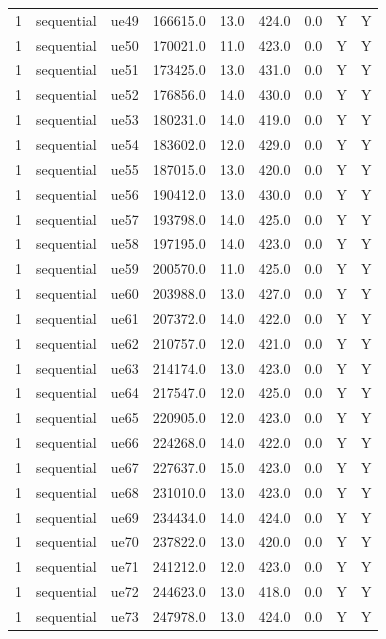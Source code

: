 \begin{table}[ht]
\begin{tabular}{|c|c|c|c|c|c|c|c|c|}
1 & sequential & ue49 & 166615.0 & 13.0 & 424.0 & 0.0 & Y & Y \\
1 & sequential & ue50 & 170021.0 & 11.0 & 423.0 & 0.0 & Y & Y \\
1 & sequential & ue51 & 173425.0 & 13.0 & 431.0 & 0.0 & Y & Y \\
1 & sequential & ue52 & 176856.0 & 14.0 & 430.0 & 0.0 & Y & Y \\
1 & sequential & ue53 & 180231.0 & 14.0 & 419.0 & 0.0 & Y & Y \\
1 & sequential & ue54 & 183602.0 & 12.0 & 429.0 & 0.0 & Y & Y \\
1 & sequential & ue55 & 187015.0 & 13.0 & 420.0 & 0.0 & Y & Y \\
1 & sequential & ue56 & 190412.0 & 13.0 & 430.0 & 0.0 & Y & Y \\
1 & sequential & ue57 & 193798.0 & 14.0 & 425.0 & 0.0 & Y & Y \\
1 & sequential & ue58 & 197195.0 & 14.0 & 423.0 & 0.0 & Y & Y \\
1 & sequential & ue59 & 200570.0 & 11.0 & 425.0 & 0.0 & Y & Y \\
1 & sequential & ue60 & 203988.0 & 13.0 & 427.0 & 0.0 & Y & Y \\
1 & sequential & ue61 & 207372.0 & 14.0 & 422.0 & 0.0 & Y & Y \\
1 & sequential & ue62 & 210757.0 & 12.0 & 421.0 & 0.0 & Y & Y \\
1 & sequential & ue63 & 214174.0 & 13.0 & 423.0 & 0.0 & Y & Y \\
1 & sequential & ue64 & 217547.0 & 12.0 & 425.0 & 0.0 & Y & Y \\
1 & sequential & ue65 & 220905.0 & 12.0 & 423.0 & 0.0 & Y & Y \\
1 & sequential & ue66 & 224268.0 & 14.0 & 422.0 & 0.0 & Y & Y \\
1 & sequential & ue67 & 227637.0 & 15.0 & 423.0 & 0.0 & Y & Y \\
1 & sequential & ue68 & 231010.0 & 13.0 & 423.0 & 0.0 & Y & Y \\
1 & sequential & ue69 & 234434.0 & 14.0 & 424.0 & 0.0 & Y & Y \\
1 & sequential & ue70 & 237822.0 & 13.0 & 420.0 & 0.0 & Y & Y \\
1 & sequential & ue71 & 241212.0 & 12.0 & 423.0 & 0.0 & Y & Y \\
1 & sequential & ue72 & 244623.0 & 13.0 & 418.0 & 0.0 & Y & Y \\
1 & sequential & ue73 & 247978.0 & 13.0 & 424.0 & 0.0 & Y & Y \\

\end{tabular}
\end{table}
